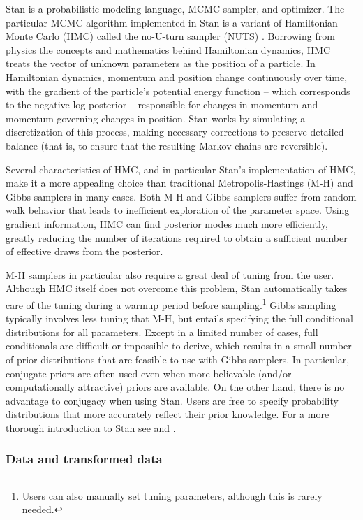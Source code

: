 Stan is a probabilistic modeling language, MCMC sampler, and optimizer. The particular MCMC algorithm implemented in Stan is a variant of Hamiltonian Monte Carlo (HMC) called the no-U-turn sampler (NUTS) . Borrowing from physics the concepts and mathematics behind Hamiltonian dynamics, HMC treats the vector of unknown parameters as the position of a particle. In Hamiltonian dynamics, momentum and position change continuously over time, with the gradient of the particle's potential energy function --  which corresponds to the negative log posterior -- responsible for changes in momentum and momentum governing changes in position. Stan works by simulating a discretization of this process, making necessary corrections to preserve detailed balance (that is, to ensure that the resulting Markov chains are reversible). 

Several characteristics of HMC, and in particular Stan's implementation of HMC, make it a more appealing choice than traditional Metropolis-Hastings (M-H) and Gibbs samplers in many cases. Both M-H and Gibbs samplers suffer from random walk behavior that leads to inefficient exploration of the parameter space. Using gradient information, HMC can find posterior modes much more efficiently, greatly reducing the number of iterations required to obtain a sufficient number of effective draws from the posterior. 

M-H samplers in particular also require a great deal of tuning from the user. Although HMC itself does not overcome this problem, Stan automatically takes care of the tuning during a warmup period before sampling.\footnote{Users can also manually set tuning parameters, although this is rarely needed.} Gibbs sampling typically involves less tuning that M-H, but entails specifying the full conditional distributions for all parameters. Except in a limited number of cases, full conditionals are difficult or impossible to derive, which results in a small number of prior distributions that are feasible to use with Gibbs samplers. In particular, conjugate priors are often used even when more believable (and/or computationally attractive) priors are available. On the other hand, there is no advantage to conjugacy when using Stan. Users are free to specify probability distributions that more accurately reflect their prior knowledge. For a more thorough introduction to Stan see  and .

\subsubsection{Data and transformed data}


